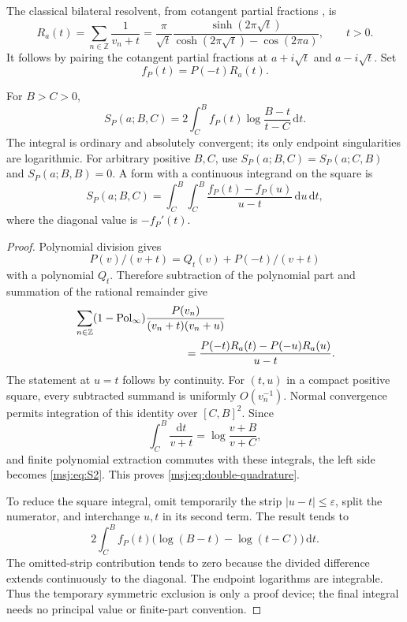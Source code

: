 The classical bilateral resolvent, from cotangent partial fractions \cite{DLMF}, is
\begin{equation}
 R_a(t)=\sum_{n\in\mathbb Z}\frac1{v_n+t}
       =\frac{\pi}{\sqrt t}
        \frac{\sinh(2\pi\sqrt t)}
             {\cosh(2\pi\sqrt t)-\cos(2\pi a)},\qquad t>0.
 \label{msj:eq:resolvent}
\end{equation}
It follows by pairing the cotangent partial fractions at
$a+i\sqrt t$ and $a-i\sqrt t$. Set
\[
 f_P(t)=P(-t)R_a(t).
\]

\begin{theorem}
\label{msj:thm:quadrature}
For $B>C>0$,
\begin{equation}
 \boxed{\displaystyle
 S_P(a;B,C)=2\int_C^B f_P(t)
                     \log\frac{B-t}{t-C}\,\mathrm dt.}
 \label{msj:eq:quadrature}
\end{equation}
The integral is ordinary and absolutely convergent; its only endpoint
singularities are logarithmic. For arbitrary positive $B,C$, use
$S_P(a;B,C)=S_P(a;C,B)$ and $S_P(a;B,B)=0$. A form with a continuous
integrand on the square is
\begin{equation}
 S_P(a;B,C)=\int_C^B\int_C^B
      \frac{f_P(t)-f_P(u)}{u-t}\,\mathrm du\,\mathrm dt,
 \label{msj:eq:double-quadrature}
\end{equation}
where the diagonal value is $-f_P'(t)$.
\end{theorem}

\begin{proof}
Polynomial division gives
\[
 P(v)/(v+t)=Q_t(v)+P(-t)/(v+t)
\]
with a polynomial $Q_t$. Therefore subtraction of the polynomial part
and summation of the rational remainder give
\begin{align*}
 &\sum_{n\in\mathbb Z}(1-\operatorname{Pol}_{\infty})
          \frac{P(v_n)}{(v_n+t)(v_n+u)}\\
 &\hspace{35mm}=\frac{P(-t)R_a(t)-P(-u)R_a(u)}{u-t}.
\end{align*}
The statement at $u=t$ follows by continuity. For $(t,u)$ in a compact
positive square, every subtracted summand is uniformly $O(v_n^{-1})$.
Normal convergence permits integration of this identity over $[C,B]^2$.
Since
\[
 \int_C^B\frac{\mathrm dt}{v+t}=\log\frac{v+B}{v+C},
\]
and finite polynomial extraction commutes with these integrals, the
left side becomes \eqref{msj:eq:S2}. This proves
\eqref{msj:eq:double-quadrature}.

To reduce the square integral, omit temporarily the strip
$|u-t|\le\varepsilon$, split the numerator, and interchange $u,t$ in
its second term. The result tends to
\[
 2\int_C^B f_P(t)\bigl(\log(B-t)-\log(t-C)\bigr)\,\mathrm dt.
\]
The omitted-strip contribution tends to zero because the divided
difference extends continuously to the diagonal. The endpoint
logarithms are integrable. Thus the temporary symmetric exclusion is
only a proof device; the final integral needs no principal value or
finite-part convention.
\end{proof}

